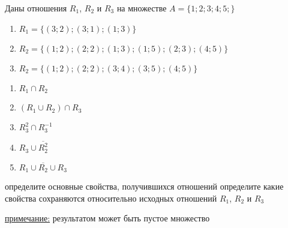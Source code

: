 \question
Даны отношения $R_1$, $R_2$ и $R_3$ на множестве $A = \{1; 2; 3; 4; 5;\}$ 
\begin{enumerate}
	\renewcommand{\labelenumi}{\alph{enumi})}
	\item $R_1 = \{(3; 2); (3; 1); (1; 3)\}$
	\item $R_2 = \{(1; 2); (2; 2); (1; 3); (1; 5); (2; 3); (4; 5)\}$
	\item $R_2 = \{(1; 2); (2; 2); (3; 4); (3; 5); (4; 5)\}$
\end{enumerate}

\begin{enumerate}
	\renewcommand{\labelenumi}{\alph{enumi})}
	\item $R_1 \cap R_2$
	\item $(R_1 \cup R_2) \cap R_3$
	\item $R_3^2 \cap R_3^{-1}$
	\item $R_3 \cup \overline{R_2^2}$
	\item $R_1 \cup \overline{R_2} \cup R_3$
\end{enumerate}

определите основные свойства, получившихся отношений
определите какие свойства сохраняются относительно исходных отношений $R_1$, $R_2$ и $R_3$ 

\underline{примечание:} результатом может быть пустое множество